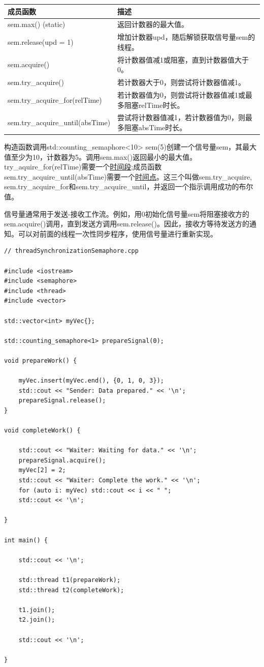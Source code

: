 \begin{table}[H]
\centering
\begin{tabular}{ll}
\textbf{成员函数} & \textbf{描述}                                                       \\ \hline
sem.max() (static)       & 返回计数器的最大值。                                  \\
sem.release(upd = 1)             & 增加计数器upd，随后解锁获取信号量sem的线程。  \\
sem.acquire()            & 将计数器值减1或阻塞，直到计数器值大于0。 \\
sem.try\_acquire()       & 若计数器大于0，则尝试将计数器值减1。               \\
sem.try\_acquire\_for(relTime)   & 若计数器值为0，则尝试将计数器值减1或最多阻塞relTime时长。   \\
sem.try\_acquire\_until(absTime) & 尝试将计数器值减1，若计数器值为0，则最多阻塞absTime时长。
\end{tabular}
\end{table}

构造函数调用std::counting\_semaphore<10> sem(5)创建一个信号量sem，其最大值至少为10，计数器为5。调用sem.max()返回最小的最大值。try\_aquire\_for(relTime)需要一个\href{https://en.cppreference.com/w/cpp/chrono/duration}{时间段};成员函数sem.try\_acquire\_until(absTime)需要一个\href{https://en.cppreference.com/w/cpp/chrono/time_point}{时间点}。这三个叫做sem.try\_acquire, sem.try\_acquire\_for和sem.try\_acquire\_until，并返回一个指示调用成功的布尔值。

信号量通常用于发送-接收工作流。例如，用0初始化信号量sem将阻塞接收方的sem.acquire()调用，直到发送方调用sem.release()。因此，接收方等待发送方的通知。可以对前面的线程一次性同步程序，使用信号量进行重新实现。

\begin{lstlisting}[style=styleCXX]
// threadSynchronizationSemaphore.cpp

#include <iostream>
#include <semaphore>
#include <thread>
#include <vector>

std::vector<int> myVec{};

std::counting_semaphore<1> prepareSignal(0);

void prepareWork() {

	myVec.insert(myVec.end(), {0, 1, 0, 3});
	std::cout << "Sender: Data prepared." << '\n';
	prepareSignal.release();
}

void completeWork() {

	std::cout << "Waiter: Waiting for data." << '\n';
	prepareSignal.acquire();
	myVec[2] = 2;
	std::cout << "Waiter: Complete the work." << '\n';
	for (auto i: myVec) std::cout << i << " ";
	std::cout << '\n';

}

int main() {

	std::cout << '\n';
	
	std::thread t1(prepareWork);
	std::thread t2(completeWork);
	
	t1.join();
	t2.join();
	
	std::cout << '\n';

}
\end{lstlisting}

